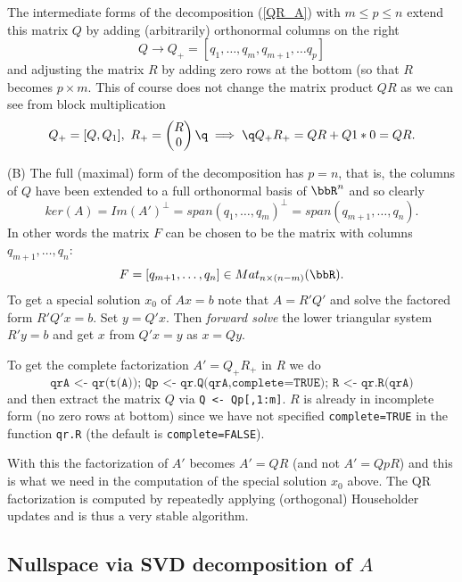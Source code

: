 The intermediate forms of the decomposition (\ref{QR_A}) with $m\leq p\leq n$
extend this matrix $Q$ by adding (arbitrarily) orthonormal columns on the right
$$
Q \rightarrow Q_+=[q_1,\dots,q_m,q_{m+1},\dots q_p]
$$
and adjusting the matrix $R$ by adding zero rows at the bottom (so that $R$ becomes 
$p\times m$. This of course does not change the matrix product $QR$ as we can see from block 
multiplication
$$
Q_+=[Q,Q_1],\ 
R_+=
\begin{pmatrix}R\\0\end{pmatrix}
\q\implies\q 
Q_+R_+=QR+Q1*0 =QR.
$$

\smallskip\noindent
(B) The full (maximal) form of the decomposition has $p=n$, that is, the columns
of $Q$ have been extended to a full orthonormal basis of $\bbR^n$ and so clearly
%
\begin{equation}
\label{nullspace_QR}
ker(A)=Im(A')^\perp=span(q_1,\dots,q_m)^\perp=span(q_{m+1},\dots,q_n).
\end{equation}
%
In other words the matrix $F$ can be chosen to be the matrix with columns
$q_{m+1},\dots,q_n$:
%
\begin{equation}
\label{mat_F}
F=[q_{m+1},\dots,q_n]\in Mat_{n\times(n-m)}(\bbR).
\end{equation}
%
To get a special solution $x_0$ of $Ax=b$ note that $A=R'Q'$ and solve
the factored form $R'Q'x=b$. Set $y=Q'x$. 
Then \textit{forward solve} the lower triangular system $R'y=b$ 
and get $x$ from $Q'x=y$ as $x=Qy$.

\smallskip\noindent
To get the complete factorization $A'=Q_+R_+$ in \textit{R} we do
$$
\texttt{qrA <- qr(t(A));\ Qp <- qr.Q(qrA,complete=TRUE);\ R <- qr.R(qrA)}
$$
and then extract the matrix $Q$ via \texttt{Q <- Qp[,1:m]}. $R$ is already
in incomplete form (no zero rows at bottom) since we have not specified
\texttt{complete=TRUE} in the function \texttt{qr.R} (the default is
\texttt{complete=FALSE}).

With this the factorization of $A'$ becomes $A'=QR$ (and not $A'=QpR$) and this
is what we need in the computation of the special solution $x_0$ above. 
The QR factorization is computed by repeatedly applying (orthogonal) Householder
updates and is thus a very stable algorithm.


\subsection{Nullspace via SVD decomposition of $A$}

